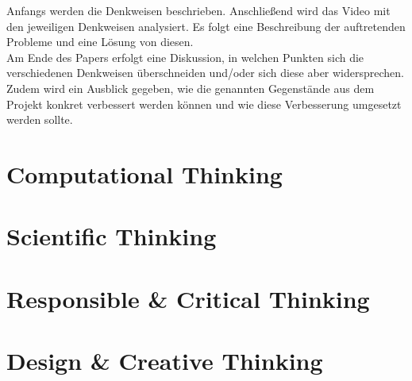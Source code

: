 \documentclass[sigchi-a, authorversion]{acmart}
\begin{document}
Anfangs werden die Denkweisen beschrieben. Anschließend wird das Video mit den jeweiligen Denkweisen analysiert. Es folgt eine Beschreibung der auftretenden Probleme und eine Lösung von diesen.\\
Am Ende des Papers erfolgt eine Diskussion, in welchen Punkten sich die verschiedenen Denkweisen überschneiden und/oder sich diese aber widersprechen. Zudem wird ein Ausblick gegeben, wie die genannten Gegenstände aus dem Projekt\cite{uninvatedGuests} konkret verbessert werden können und wie diese Verbesserung umgesetzt werden sollte.

\newpage
\section{Computational Thinking}


\newpage

\section{Scientific Thinking}


\newpage

\section{Responsible \& Critical Thinking}


\newpage

\section{Design \& Creative Thinking}


\newpage

\end{document}
